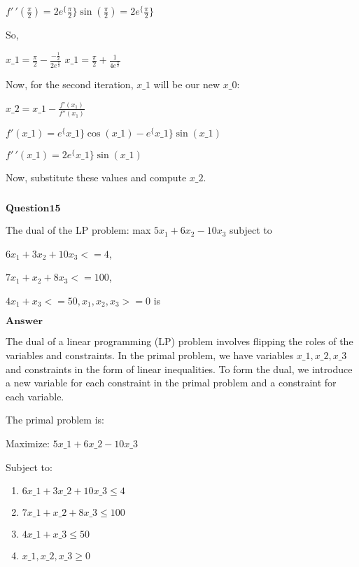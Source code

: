 \documentclass[11pt]{article}
\makeatletter
\providecommand{\tightlist}{%
      \setlength{\itemsep}{0pt}\setlength{\parskip}{0pt}}
\newcommand{\boxspacing}{\kern\kvtcb@left@rule\kern\kvtcb@boxsep}
\newcommand{\prompt}[4]{
        {\ttfamily\llap{{\color{#2}[#3]:\hspace{3pt}#4}}\vspace{-\baselineskip}}
    }
\makeatother
\begin{document}
$ f'\,'(\frac{\pi}{2}) = 2e^\{\frac{\pi}{2}\} \sin(\frac{\pi}{2}) =
2e^\{\frac{\pi}{2}\} $

So,

$ x\_1 = \frac{\pi}{2} - \frac{-\frac{1}{2}}{2e^{\frac{\pi}{2}}} $ $
x\_1 = \frac{\pi}{2} + \frac{1}{4e^{\frac{\pi}{2}}} $

Now, for the second iteration, $ x\_1 $ will be our new $ x\_0 $:

$ x\_2 = x\_1 - \frac{f'(x_1)}{f''(x_1)} $

$ f'(x\_1) = e^\{x\_1\} \cos(x\_1) - e^\{x\_1\} \sin(x\_1) $

$ f'\,'(x\_1) = 2e^\{x\_1\} \sin(x\_1) $

Now, substitute these values and compute $ x\_2 $.

    \begin{tcolorbox}[breakable, size=fbox, boxrule=1pt, pad at break*=1mm,colback=cellbackground, colframe=cellborder]
\prompt{In}{incolor}{ }{\boxspacing}
\begin{Verbatim}[commandchars=\\\{\}]

\end{Verbatim}
\end{tcolorbox}

    $\textbf{Question15}$

The dual of the LP problem: max $5x_1+6x_2-10x_3$ subject to

$6x_1+3x_2+10x_3 <= 4$,

$7x_1+x_2+8x_3<=100$,

$4x_1+x_3<=50,x_1,x_2,x_3>=0$ is

$\textbf{Answer}$

    The dual of a linear programming (LP) problem involves flipping the
roles of the variables and constraints. In the primal problem, we have
variables $ x\_1, x\_2, x\_3 $ and constraints in the form of linear
inequalities. To form the dual, we introduce a new variable for each
constraint in the primal problem and a constraint for each variable.

The primal problem is:

Maximize: $ 5x\_1 + 6x\_2 - 10x\_3 $

Subject to:

\begin{enumerate}
\def\labelenumi{\arabic{enumi}.}
\tightlist
\item
  $ 6x\_1 + 3x\_2 + 10x\_3 \leq 4 $
\item
  $ 7x\_1 + x\_2 + 8x\_3 \leq 100 $
\item
  $ 4x\_1 + x\_3 \leq 50 $
\item
  $ x\_1, x\_2, x\_3 \geq 0 $
\end{enumerate}
\end{document}
